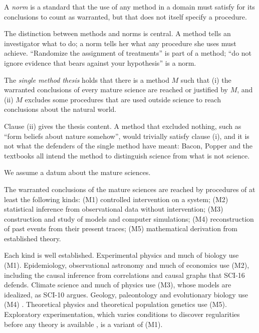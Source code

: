 \documentclass{situationist-preprint}
\begin{document}
\begin{definition}[Norm]\label{d:norm}
A \emph{norm} is a standard that the use of any method in a domain must satisfy for its conclusions to count as warranted, but that does not itself specify a procedure.
\end{definition}

The distinction between methods and norms is central. A method tells an investigator what to do; a norm tells her what any procedure she uses must achieve. \enquote{Randomize the assignment of treatments} is part of a method; \enquote{do not ignore evidence that bears against your hypothesis} is a norm.

\begin{definition}\label{d:smt}
The \emph{single method thesis} holds that there is a method $M$ such that (i) the warranted conclusions of every mature science are reached or justified by $M$, and (ii) $M$ excludes some procedures that are used outside science to reach conclusions about the natural world.
\end{definition}

Clause (ii) gives the thesis content. A method that excluded nothing, such as \enquote{form beliefs about nature somehow}, would trivially satisfy clause (i), and it is not what the defenders of the single method have meant: Bacon, Popper and the textbooks all intend the method to distinguish science from what is not science.

We assume a datum about the mature sciences.

\begin{assumption}\label{a:div}
The warranted conclusions of the mature sciences are reached by procedures of at least the following kinds: (M1) controlled intervention on a system; (M2) statistical inference from observational data without intervention; (M3) construction and study of models and computer simulations; (M4) reconstruction of past events from their present traces; (M5) mathematical derivation from established theory.
\end{assumption}

Each kind is well established. Experimental physics and much of biology use (M1). Epidemiology, observational astronomy and much of economics use (M2), including the causal inference from correlations and causal graphs that SCI-16 defends. Climate science and much of physics use (M3), whose models are idealized, as SCI-10 argues. Geology, paleontology and evolutionary biology use (M4) \citep{Cleland2002}. Theoretical physics and theoretical population genetics use (M5). Exploratory experimentation, which varies conditions to discover regularities before any theory is available \citep{Steinle1997}, is a variant of (M1).
\end{document}
